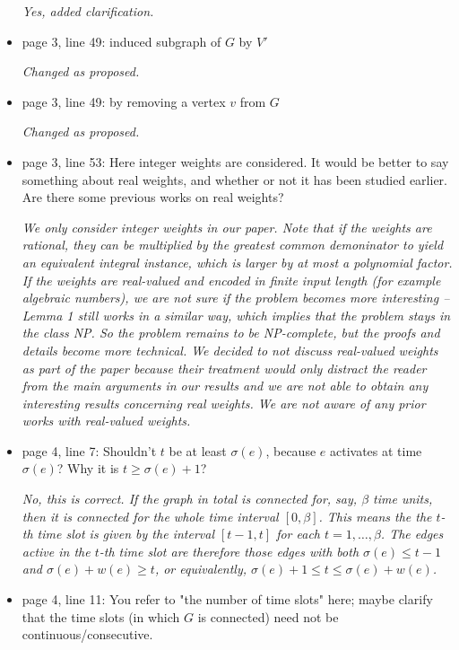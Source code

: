 \documentclass[11pt,a4paper]{article}
\begin{document}
\begin{itemize}
\textit{Yes, added clarification.}

\item page 3, line 49: induced subgraph of $G$ by $V'$

\textit{Changed as proposed.}

\item page 3, line 49: by removing a vertex $v$ from $G$

\textit{Changed as proposed.}

\item page 3, line 53: Here integer weights are considered. It would be better to say something about real weights, and whether or not it has been studied earlier. Are there some previous works on real weights?

\textit{We only consider integer weights in our paper. Note that if the weights are rational, they can be multiplied by the greatest common demoninator to yield an equivalent integral instance, which is larger by at most a polynomial factor. 
If the weights are real-valued and encoded in finite input length (for example algebraic numbers), we are not sure if the problem becomes more interesting -- Lemma 1 still works in a similar way, which implies that the problem stays in the class NP. So the problem remains to be NP-complete, but the proofs and details become more technical. 
We decided to not discuss real-valued weights as part of the paper because their treatment would only distract the reader from 
the main arguments in our results and we are not able to obtain any interesting results concerning real weights.
We are not aware of any prior works with real-valued weights.}

\item page 4, line 7: Shouldn't $t$ be at least $\sigma(e)$, because $e$ activates at time $\sigma(e)$? Why it is $t \geq \sigma(e)+1$?

\textit{No, this is correct. If the graph in total is connected for, say, $\beta$ time units, then it is connected for the whole time interval $[0, \beta]$. This means the the $t$-th time slot is given by the interval $[t-1,t]$ for each $t=1,\dots,\beta$. The edges active in the $t$-th time slot are therefore those edges with both $\sigma(e) \leq t-1$ and $\sigma(e) + w(e) \geq t$, or equivalently, $\sigma(e) + 1 \leq t \leq \sigma(e) + w(e)$.}

\item page 4, line 11: You refer to "the number of time slots" here; maybe clarify that the time slots (in which $G$ is connected) need not be continuous/consecutive.


\end{itemize}
\end{document}
